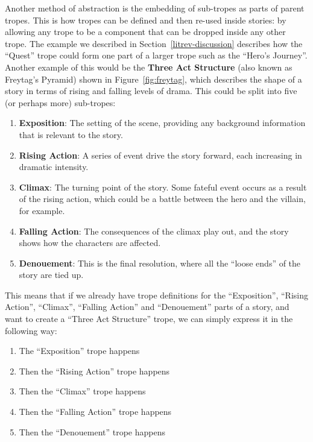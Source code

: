 \documentclass[11pt]{report}
\begin{document}
Another method of abstraction is the embedding of sub-tropes as parts of
parent tropes. This is how tropes can be defined and then re-used inside stories: by allowing any
trope to be a component that can be dropped inside any other trope.
The example we described in Section~\ref{litrev-discussion}
describes how the ``Quest'' trope could form one part of a larger trope
such as the ``Hero's Journey''. Another example of this would be the
\textbf{Three Act Structure} (also known as Freytag's Pyramid) shown in Figure~\ref{fig:freytag}, which describes the shape of a
story in terms of rising and falling levels of drama. This could be split into
five (or perhaps more) sub-tropes:

\begin{enumerate}
  \item \textbf{Exposition}: The setting of the scene, providing any background
    information that is relevant to the story.
  \item \textbf{Rising Action}: A series of event drive the story forward, each
    increasing in dramatic intensity.
  \item \textbf{Climax}: The turning point of the story. Some fateful event
    occurs as a result of the rising action, which could be a battle between the
    hero and the villain, for example.
  \item \textbf{Falling Action}: The consequences of the climax play out, and
    the story shows how the characters are affected.
  \item \textbf{Denouement}: This is the final resolution, where all the ``loose
    ends'' of the story are tied up.
\end{enumerate}

This means that if we already have trope definitions for the ``Exposition'',
``Rising Action'', ``Climax'', ``Falling Action'' and ``Denouement'' parts of a
story, and want to create a ``Three Act Structure'' trope, we can simply express
it in the following way:

\begin{enumerate}
  \item The ``Exposition'' trope happens
  \item Then the ``Rising Action'' trope happens
  \item Then the ``Climax'' trope happens
  \item Then the ``Falling Action'' trope happens
  \item Then the ``Denouement'' trope happens
\end{enumerate}
\end{document}
